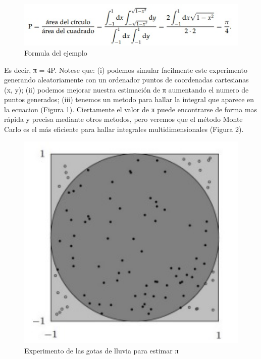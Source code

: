 \documentclass{article}
\begin{document}
\begin{figure} %
    \centering
    \includegraphics[width=150mm]{Formula.jpg} %
    \caption{Formula del ejemplo}
    \label{formula}
\end{figure}

\item
Es decir, π = 4P. Notese que: (i) podemos simular facilmente este experimento generando aleatoriamente con un ordenador puntos de coordenadas cartesianas (x, y); (ii) podemos mejorar nuestra estimación de π aumentando el numero de puntos generados; (iii) tenemos un metodo para hallar la integral que aparece en la ecuacion (Figura 1). Ciertamente el valor de π puede encontrarse de forma mas rápida y precisa mediante otros metodos, pero veremos que el método Monte Carlo es el más eficiente para hallar integrales multidimensionales (Figura 2).

\begin{figure} %
    \centering
    \includegraphics[width=125mm]{Gotas de lluvia.jpg} %
    \caption{Experimento de las gotas de lluvia para estimar π}
    \label{grafica}
\end{figure}
\end{document}
